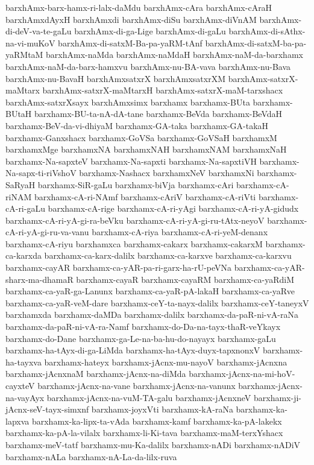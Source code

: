 {barxhAmx-barx-hamx-ri-lalx-daMdu
barxhAmx-cAra
barxhAmx-cAraH
barxhAmxdAyxH
barxhAmxdi
barxhAmx-diSu
barxhAmx-diVnAM
barxhAmx-di-deV-va-te-gaLu
barxhAmx-di-ga-Lige
barxhAmx-di-gaLu
barxhAmx-di-sAthx-na-vi-muKoV
barxhAmx-di-satxM-Ba-pa-yaRM-tAnf
barxhAmx-di-satxM-ba-pa-yaRMtaM
barxhAmx-naMda
barxhAmx-naMdaH
barxhAmx-naM-da-barxhamx
barxhAmx-naM-da-barx-hamxvu
barxhAmx-nu-BA-vava
barxhAmx-nu-Bava
barxhAmx-nu-BavaH
barxhAmxsatxrX
barxhAmxsatxrXM
barxhAmx-satxrX-maMtarx
barxhAmx-satxrX-maMtarxH
barxhAmx-satxrX-maM-tarxshacx
barxhAmx-satxrXsayx
barxhAmxsimx
barxhamx
barxhamx-BUta
barxhamx-BUtaH
barxhamx-BU-ta-nA-dA-tane
barxhamx-BeVda
barxhamx-BeVdaH
barxhamx-BeV-da-vi-dhiyaM
barxhamx-GA-taka
barxhamx-GA-takaH
barxhamx-Ganxshacx
barxhamx-GoVSa
barxhamx-GoVSaH
barxhamxM
barxhamxMge
barxhamxNA
barxhamxNAH
barxhamxNAM
barxhamxNaH
barxhamx-Na-sapxteV
barxhamx-Na-sapxti
barxhamx-Na-sapxtiVH
barxhamx-Na-sapx-ti-riVshoV
barxhamx-Nashacx
barxhamxNeV
barxhamxNi
barxhamx-SaRyaH
barxhamx-SiR-gaLu
barxhamx-biVja
barxhamx-cAri
barxhamx-cA-riNAM
barxhamx-cA-ri-NAmf
barxhamx-cAriV
barxhamx-cA-riVti
barxhamx-cA-ri-gaLu
barxhamx-cA-rige
barxhamx-cA-ri-yAgi
barxhamx-cA-ri-yA-gidudx
barxhamx-cA-ri-yA-gi-ra-beVku
barxhamx-cA-ri-yA-gi-ru-tAtx-neyoV
barxhamx-cA-ri-yA-gi-ru-va-vanu
barxhamx-cA-riya
barxhamx-cA-ri-yeM-denanx
barxhamx-cA-riyu
barxhamxca
barxhamx-cakarx
barxhamx-cakarxM
barxhamx-ca-karxda
barxhamx-ca-karx-dalilx
barxhamx-ca-karxve
barxhamx-ca-karxvu
barxhamx-cayAR
barxhamx-ca-yAR-pa-ri-garx-ha-rU-peVNa
barxhamx-ca-yAR-sharx-ma-dhamaR
barxhamx-cayaR
barxhamx-cayaRM
barxhamx-ca-yaRdiM
barxhamx-ca-yaR-ga-Lanunx
barxhamx-ca-yaR-pA-lakaH
barxhamx-ca-yaRve
barxhamx-ca-yaR-veM-dare
barxhamx-ceY-ta-nayx-dalilx
barxhamx-ceY-taneyxV
barxhamxda
barxhamx-daMDa
barxhamx-dalilx
barxhamx-da-paR-ni-vA-raNa
barxhamx-da-paR-ni-vA-ra-Namf
barxhamx-do-Da-na-tayx-thaR-veYkayx
barxhamx-do-Dane
barxhamx-ga-Le-na-ba-hu-do-nayayx
barxhamx-gaLu
barxhamx-ha-tAyx-di-ga-LiMda
barxhamx-ha-tAyx-duyx-tapxnonxV
barxhamx-ha-tayxva
barxhamx-hateyx
barxhamx-jAcnx-mu-nayoV
barxhamx-jAcnxna
barxhamx-jAcnxnaM
barxhamx-jAcnx-na-diMda
barxhamx-jAcnx-na-mi-hoV-cayxteV
barxhamx-jAcnx-na-vane
barxhamx-jAcnx-na-vanunx
barxhamx-jAcnx-na-vayAyx
barxhamx-jAcnx-na-vuM-TA-galu
barxhamx-jAcnxneV
barxhamx-ji-jAcnx-seV-tayx-simxnf
barxhamx-joyxVti
barxhamx-kA-raNa
barxhamx-ka-lapxva
barxhamx-ka-lipx-ta-vAda
barxhamx-kamf
barxhamx-ka-pA-lakekx
barxhamx-ka-pA-la-vilalx
barxhamx-li-Ki-tava
barxhamx-maM-terxYshacx
barxhamx-meV-tatf
barxhamx-mu-Ka-dalilx
barxhamx-nADi
barxhamx-nADiV
barxhamx-nALa
barxhamx-nA-La-da-lilx-ruva
}
